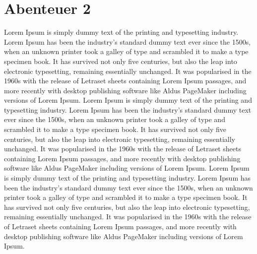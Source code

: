 \documentclass[11pt]{article}
\begin{document}
\section{Abenteuer 2}
\label{sec:orgb5243af}
Lorem Ipsum is simply dummy text of the printing and typesetting
industry. Lorem Ipsum has been the industry's standard dummy text ever
since the 1500s, when an unknown printer took a galley of type and
scrambled it to make a type specimen book. It has survived not only
five centuries, but also the leap into electronic typesetting,
remaining essentially unchanged. It was popularised in the 1960s with
the release of Letraset sheets containing Lorem Ipsum passages, and
more recently with desktop publishing software like Aldus PageMaker
including versions of Lorem Ipsum. 
Lorem Ipsum is simply dummy text of the printing and typesetting
industry. Lorem Ipsum has been the industry's standard dummy text ever
since the 1500s, when an unknown printer took a galley of type and
scrambled it to make a type specimen book. It has survived not only
five centuries, but also the leap into electronic typesetting,
remaining essentially unchanged. It was popularised in the 1960s with
the release of Letraset sheets containing Lorem Ipsum passages, and
more recently with desktop publishing software like Aldus PageMaker
including versions of Lorem Ipsum. Lorem Ipsum is simply dummy text of
the printing and typesetting industry. Lorem Ipsum has been the
industry's standard dummy text ever since the 1500s, when an unknown
printer took a galley of type and scrambled it to make a type specimen
book. It has survived not only five centuries, but also the leap into
electronic typesetting, remaining essentially unchanged. It was
popularised in the 1960s with the release of Letraset sheets
containing Lorem Ipsum passages, and more recently with desktop
publishing software like Aldus PageMaker including versions of Lorem
Ipsum. 
\end{document}
